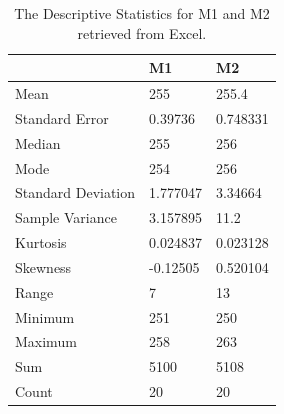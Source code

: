 \documentclass[11pt, letterpaper, titlepage]{article}
\begin{document}
\begin{enumerate}
\begin{enumerate}
        \begin{table}[]
            \centering
            \caption{The Descriptive Statistics for M1 and M2 retrieved from Excel.}
            \begin{tabular}{@{}lll@{}} \toprule
                & M1       & M2       \\ \midrule
                Mean               & 255      & 255.4    \\
                Standard Error     & 0.39736  & 0.748331 \\
                Median             & 255      & 256      \\
                Mode               & 254      & 256      \\
                Standard Deviation & 1.777047 & 3.34664  \\
                Sample Variance    & 3.157895 & 11.2     \\
                Kurtosis           & 0.024837 & 0.023128 \\
                Skewness           & -0.12505 & 0.520104 \\
                Range              & 7        & 13       \\
                Minimum            & 251      & 250      \\
                Maximum            & 258      & 263      \\
                Sum                & 5100     & 5108     \\
                Count              & 20       & 20       \\ \bottomrule
            \end{tabular}
            \label{4a}
        \end{table}
    \end{enumerate}
\end{enumerate}
\end{document}
